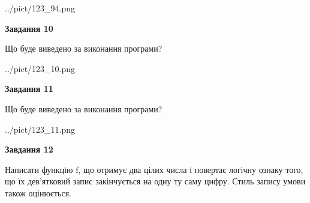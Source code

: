 \documentclass[12pt, ukrainian]{article}
\begin{document}
{\begin {large}
\begin{center}
	{../pict/123_94.png}
\end{center}
\newpage

{\begin {center}\textbf{Завдання 10}\end {center}}

Що буде виведено за виконання програми?\par
\begin{center}
	{../pict/123_10.png}
\end{center}
\newpage

{\begin {center}\textbf{Завдання 11}\end {center}}

Що буде виведено за виконання програми?\par
\begin{center}
	{../pict/123_11.png}
\end{center}
\newpage

{\begin {center}\textbf{Завдання 12}\end {center}}


Написати функцiю f, що отримує два цілих числа i повертає логічну ознаку того, що їх дев'ятковий запис закінчується на одну ту саму цифру. Стиль запису умови також оцінюється.\par
\newpage

\end {large}}
\end{document}
